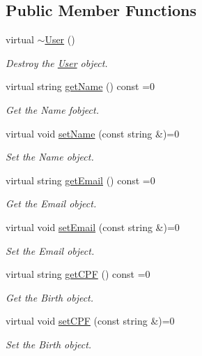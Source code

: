 \subsection*{Public Member Functions}
\begin{DoxyCompactItemize}
\item 
virtual \hyperlink{classUser_a7d1cf7c22ba031caec015ec427419513}{$\sim$\+User} ()
\begin{DoxyCompactList}\small\item\em Destroy the \hyperlink{classUser}{User} object. \end{DoxyCompactList}\item 
virtual string \hyperlink{classUser_a10b64aca04c37b66fcb5a112e87f97ac}{get\+Name} () const =0
\begin{DoxyCompactList}\small\item\em Get the Name fobject. \end{DoxyCompactList}\item 
virtual void \hyperlink{classUser_a47339f4f166d9baa023fdd59e81c965d}{set\+Name} (const string \&)=0
\begin{DoxyCompactList}\small\item\em Set the Name object. \end{DoxyCompactList}\item 
virtual string \hyperlink{classUser_a58eae5ae9bc079ca5ee31c41326b229e}{get\+Email} () const =0
\begin{DoxyCompactList}\small\item\em Get the Email object. \end{DoxyCompactList}\item 
virtual void \hyperlink{classUser_ac72e220fdcbb3decc392d2729f27e6b5}{set\+Email} (const string \&)=0
\begin{DoxyCompactList}\small\item\em Set the Email object. \end{DoxyCompactList}\item 
virtual string \hyperlink{classUser_a2a23ddf63962cdb3d8cef2054a0a27a0}{get\+C\+PF} () const =0
\begin{DoxyCompactList}\small\item\em Get the Birth object. \end{DoxyCompactList}\item 
virtual void \hyperlink{classUser_ac10d34adddaa80cb544eab7c5b1227f5}{set\+C\+PF} (const string \&)=0
\begin{DoxyCompactList}\small\item\em Set the Birth object. \end{DoxyCompactList}\item 

\end{DoxyCompactItemize}
